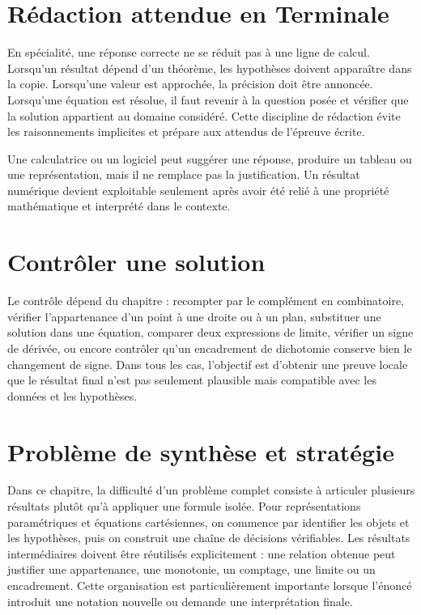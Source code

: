 \section{Rédaction attendue en Terminale}
En spécialité, une réponse correcte ne se réduit pas à une ligne de calcul. Lorsqu'un résultat dépend d'un théorème, les hypothèses doivent apparaître dans la copie. Lorsqu'une valeur est approchée, la précision doit être annoncée. Lorsqu'une équation est résolue, il faut revenir à la question posée et vérifier que la solution appartient au domaine considéré. Cette discipline de rédaction évite les raisonnements implicites et prépare aux attendus de l'épreuve écrite.

\begin{attention}
Une calculatrice ou un logiciel peut suggérer une réponse, produire un tableau ou une représentation, mais il ne remplace pas la justification. Un résultat numérique devient exploitable seulement après avoir été relié à une propriété mathématique et interprété dans le contexte.
\end{attention}

\section{Contrôler une solution}
Le contrôle dépend du chapitre : recompter par le complément en combinatoire, vérifier l'appartenance d'un point à une droite ou à un plan, substituer une solution dans une équation, comparer deux expressions de limite, vérifier un signe de dérivée, ou encore contrôler qu'un encadrement de dichotomie conserve bien le changement de signe. Dans tous les cas, l'objectif est d'obtenir une preuve locale que le résultat final n'est pas seulement plausible mais compatible avec les données et les hypothèses.

\section{Problème de synthèse et stratégie}

Dans ce chapitre, la difficulté d'un problème complet consiste à articuler plusieurs résultats plutôt qu'à appliquer une formule isolée. Pour représentations paramétriques et équations cartésiennes, on commence par identifier les objets et les hypothèses, puis on construit une chaîne de décisions vérifiables. Les résultats intermédiaires doivent être réutilisés explicitement : une relation obtenue peut justifier une appartenance, une monotonie, un comptage, une limite ou un encadrement. Cette organisation est particulièrement importante lorsque l'énoncé introduit une notation nouvelle ou demande une interprétation finale.


